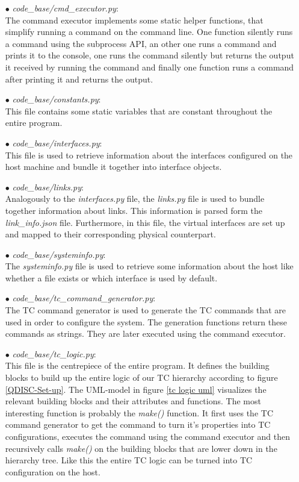 \begin{enumerate}
\item[$\bullet$]\textit{code\_base/cmd\_executor.py}:
\\
The command executor implements some static helper functions, that simplify running a command on the command line. One function silently runs a command using the subprocess \acs{API}, an other one runs a command and prints it to the console, one runs the command silently but returns the output it received by running the command and finally one function runs a command after printing it and returns the output.

\item[$\bullet$]\textit{code\_base/constants.py}:
\\
This file contains some static variables that are constant throughout the entire program. 

\item[$\bullet$]\textit{code\_base/interfaces.py}:
\\
This file is used to retrieve information about the interfaces configured on the host machine and bundle it together into interface objects.

\item[$\bullet$]\textit{code\_base/links.py}:
\\
Analogously to the \textit{interfaces.py} file, the \textit{links.py} file is used to bundle together information about links. This information is parsed form the \textit{link\_info.json} file. Furthermore, in this file, the virtual interfaces are set up and mapped to their corresponding physical counterpart.

\item[$\bullet$]\textit{code\_base/systeminfo.py}:
\\
The \textit{systeminfo.py} file is used to retrieve some information about the host like whether a file exists or which interface is used by default.

\item[$\bullet$]\textit{code\_base/tc\_command\_generator.py}:
\\
The \acs{TC} command generator is used to generate the \acs{TC} commands that are used in order to configure the system. The generation functions return these commands as strings. They are later executed using the command executor.

\item[$\bullet$]\textit{code\_base/tc\_logic.py}:
\\
This file is the centrepiece of the entire program. It defines the building blocks to build up the entire logic of our \acs{TC} hierarchy according to figure \ref{QDISC-Set-up}. The \ac{UML}-model in figure \ref{tc logic uml} visualizes the relevant building blocks and their attributes and functions. The most interesting function is probably the \textit{make()} function. It first uses the \acs{TC} command generator to get the command to turn it's properties into \acs{TC} configurations, executes the command using the command executor and then recursively calls \textit{make()} on the building blocks that are lower down in the hierarchy tree. Like this the entire \acs{TC} logic can be turned into \acs{TC} configuration on the host. 


\end{enumerate}

